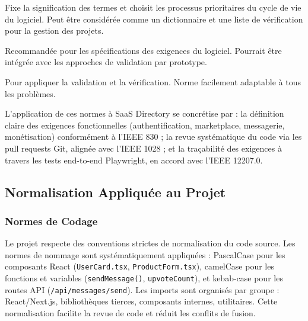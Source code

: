 \begin{definitionbox}[title={IEEE Std 12207.0}]

Fixe la signification des termes et choisit les processus prioritaires du cycle de vie du logiciel. Peut être considérée comme un dictionnaire et une liste de vérification pour la gestion des projets.

\end{definitionbox}



\begin{definitionbox}[title={IEEE Std 830}]

Recommandée pour les spécifications des exigences du logiciel. Pourrait être intégrée avec les approches de validation par prototype.

\end{definitionbox}



\begin{definitionbox}[title={IEEE Std 1028}]

Pour appliquer la validation et la vérification. Norme facilement adaptable à tous les problèmes.

\end{definitionbox}



L'application de ces normes à SaaS Directory se concrétise par : la définition claire des exigences fonctionnelles (authentification, marketplace, messagerie, monétisation) conformément à l'IEEE 830 ; la revue systématique du code via les pull requests Git, alignée avec l'IEEE 1028 ; et la traçabilité des exigences à travers les tests end-to-end Playwright, en accord avec l'IEEE 12207.0.



\subsection{Normalisation Appliquée au Projet}



\subsubsection{Normes de Codage}



Le projet respecte des conventions strictes de normalisation du code source. Les normes de nommage sont systématiquement appliquées : PascalCase pour les composants React (\texttt{UserCard.tsx}, \texttt{ProductForm.tsx}), camelCase pour les fonctions et variables (\texttt{sendMessage()}, \texttt{upvoteCount}), et kebab-case pour les routes API (\texttt{/api/messages/send}). Les imports sont organisés par groupe : React/Next.js, bibliothèques tierces, composants internes, utilitaires. Cette normalisation facilite la revue de code et réduit les conflits de fusion.



